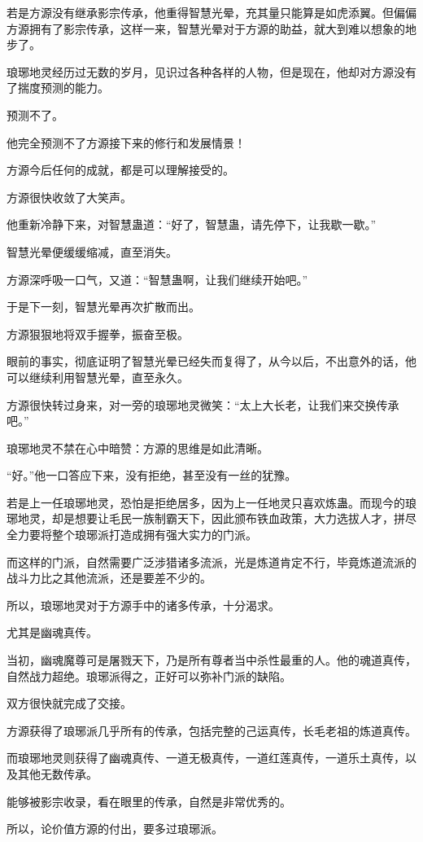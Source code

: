 \begin{this_body}
若是方源没有继承影宗传承，他重得智慧光晕，充其量只能算是如虎添翼。但偏偏方源拥有了影宗传承，这样一来，智慧光晕对于方源的助益，就大到难以想象的地步了。

琅琊地灵经历过无数的岁月，见识过各种各样的人物，但是现在，他却对方源没有了揣度预测的能力。

预测不了。

他完全预测不了方源接下来的修行和发展情景！

方源今后任何的成就，都是可以理解接受的。

方源很快收敛了大笑声。

他重新冷静下来，对智慧蛊道：“好了，智慧蛊，请先停下，让我歇一歇。”

智慧光晕便缓缓缩减，直至消失。

方源深呼吸一口气，又道：“智慧蛊啊，让我们继续开始吧。”

于是下一刻，智慧光晕再次扩散而出。

方源狠狠地将双手握拳，振奋至极。

眼前的事实，彻底证明了智慧光晕已经失而复得了，从今以后，不出意外的话，他可以继续利用智慧光晕，直至永久。

方源很快转过身来，对一旁的琅琊地灵微笑：“太上大长老，让我们来交换传承吧。”

琅琊地灵不禁在心中暗赞：方源的思维是如此清晰。

“好。”他一口答应下来，没有拒绝，甚至没有一丝的犹豫。

若是上一任琅琊地灵，恐怕是拒绝居多，因为上一任地灵只喜欢炼蛊。而现今的琅琊地灵，却是想要让毛民一族制霸天下，因此颁布铁血政策，大力选拔人才，拼尽全力要将整个琅琊派打造成拥有强大实力的门派。

而这样的门派，自然需要广泛涉猎诸多流派，光是炼道肯定不行，毕竟炼道流派的战斗力比之其他流派，还是要差不少的。

所以，琅琊地灵对于方源手中的诸多传承，十分渴求。

尤其是幽魂真传。

当初，幽魂魔尊可是屠戮天下，乃是所有尊者当中杀性最重的人。他的魂道真传，自然战力超绝。琅琊派得之，正好可以弥补门派的缺陷。

双方很快就完成了交接。

方源获得了琅琊派几乎所有的传承，包括完整的己运真传，长毛老祖的炼道真传。

而琅琊地灵则获得了幽魂真传、一道无极真传，一道红莲真传，一道乐土真传，以及其他无数传承。

能够被影宗收录，看在眼里的传承，自然是非常优秀的。

所以，论价值方源的付出，要多过琅琊派。


\end{this_body}

